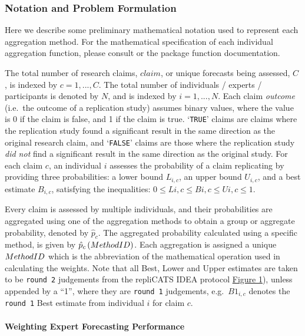 \documentclass[article]{jss}
\let\oldparagraph\paragraph
\renewcommand{\paragraph}[1]{\oldparagraph{#1}\mbox{}}
\begin{document}
\hypertarget{notation-and-problem-formulation}{%
\subsubsection{Notation and Problem
Formulation}\label{notation-and-problem-formulation}}

Here we describe some preliminary mathematical notation used to
represent each aggregation method. For the mathematical specification of
each individual aggregation function, please consult \citep{Hanea2021}
or the  package function documentation.

The total number of research claims, \(claim\), or unique forecasts
being assessed, \(C\) , is indexed by \(c = 1, ..., C\). The total
number of individuals / experts / participants is denoted by \(N\), and
is indexed by \(i = 1, ..., N\). Each claim \emph{outcome} (i.e.~the
outcome of a replication study) assumes binary values, where the value
is 0 if the claim is false, and 1 if the claim is true. `\texttt{TRUE}'
claims are claims where the replication study found a significant result
in the same direction as the original research claim, and
`\texttt{FALSE}' claims are those where the replication study \emph{did
not} find a significant result in the same direction as the original
study. For each claim \(c\), an individual \(i\) assesses the
probability of a claim replicating by providing three probabilities: a
lower bound \({L}_{i,c}\), an upper bound \({U}_{i,c}\), and a best
estimate \(B_{i,c}\), satisfying the inequalities:
\(0 \le Li,c \le Bi,c \le Ui,c \le 1\).

Every claim is assessed by multiple individuals, and their probabilities
are aggregated using one of the aggregation methods to obtain a group or
aggregate probability, denoted by \(\hat{p}_c\). The aggregated
probability calculated using a specific method, is given by
\(\hat{p}_{c}\left(Method \space ID \right)\). Each aggregation is
assigned a unique \(Method \space ID\) which is the abbreviation of the
mathematical operation used in calculating the weights. Note that all
Best, Lower and Upper estimates are taken to be \texttt{round\ 2}
judgements from the repliCATS IDEA protocol
\protect\hyperlink{fig1}{Figure 1}), unless appended by a ``1'', where
they are \texttt{round\ 1} judgements, e.g.~\(B1_{i,c}\) denotes the
\texttt{round\ 1} Best estimate from individual \(i\) for claim \(c\).

\hypertarget{weighting-expert-forecasting-performance}{%
\paragraph{Weighting Expert Forecasting
Performance}\label{weighting-expert-forecasting-performance}}
\end{document}
